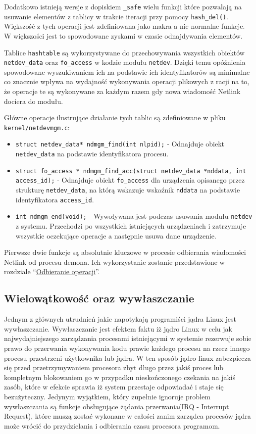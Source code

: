 \documentclass[10pt]{article}
\begin{document}
Dodatkowo istnieją wersje z dopiskiem \texttt{\_safe} wielu funkcji które pozwalają na usuwanie elementów z tablicy w trakcie iteracji przy pomocy \texttt{hash\_del()}. Większość z tych operacji jest zdefiniowana jako makra a nie normalne funkcje. W większości jest to spowodowane zyskami w czasie odnajdywania elementów.

Tablice \texttt{hashtable} są wykorzystywane do przechowywania wszystkich obiektów \texttt{netdev\_data} oraz \texttt{fo\_access} w kodzie modułu \texttt{netdev}. Dzięki temu opóźnienia spowodowane wyszukiwaniem ich na podstawie ich identyfikatorów są minimalne co znacznie wpływa na wydajność wykonywania operacji plikowych z racji na to, że operacje te są wykonywane za każdym razem gdy nowa wiadomość Netlink dociera do modułu.

Główne operacje ilustrujące działanie tych tablic są zdefiniowane w pliku \texttt{kernel/netdevmgm.c}:

\begin{itemize}
\itemsep1pt\parskip0pt
\item
  \texttt{struct netdev\_data* ndmgm\_find(int nlpid);} - Odnajduje obiekt \texttt{netdev\_data} na podstawie identyfikatora procesu.
\item
  \texttt{struct fo\_access * ndmgm\_find\_acc(struct netdev\_data *nddata, int access\_id);} - Odnajduje obiekt \texttt{fo\_access} dla urządzenia opisanego przez strukturę \texttt{netdev\_data}, na którą wskazuje wskaźnik \texttt{nddata} na podstawie identyfikatora \texttt{access\_id}.
\item
  \texttt{int ndmgm\_end(void);} - Wywoływana jest podczas usuwania modułu \texttt{netdev} z systemu. Przechodzi po wszystkich istniejących urządzeniach i zatrzymuje wszystkie oczekujące operacje a następnie usuwa dane urządzenie.
\end{itemize}

Pierwsze dwie funkcje są absolutnie kluczowe w procesie odbierania wiadomości Netlink od procesu demona. Ich wykorzystanie zostanie przedstawione w rozdziale ``\hyperref[odbieranie-operacji]{Odbieranie operacji}''.

\subsection{Wielowątkowość oraz wywłaszczanie}

Jednym z głównych utrudnień jakie napotykają programiści jądra Linux jest wywłaszczanie. Wywłaszczanie jest efektem faktu iż jądro Linux w celu jak najwydajniejszego zarządzania procesami istniejącymi w systemie rezerwuje sobie prawo do przerwania wykonywania kodu prawie każdego procesu na rzecz innego procesu przestrzeni użytkownika lub jądra. W ten sposób jądro linux zabezpiecza się przed przetrzymywaniem procesora zbyt długo przez jakiś proces lub kompletnym blokowaniem go w przypadku nieskończonego czekania na jakiś zasób, które w efekcie sprawia iż system przestaje odpowiadać i staje się bezużyteczny. Jedynym wyjątkiem, który zupełnie ignoruje problem wywłaszczania są funkcje obsługujące żądania przerwania(IRQ - Interrupt Request), które muszą zostać wykonane w całości zanim zarządca procesów jądra może wrócić do przydzielania i odbierania czasu procesora programom.
\end{document}
